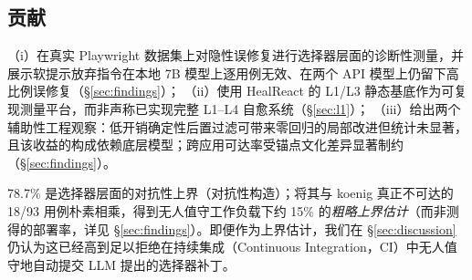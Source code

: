 \subsection{贡献}
（i）在真实 Playwright 数据集上对隐性误修复进行选择器层面的诊断性测量，并展示软提示放弃指令在本地 7B 模型上逐用例无效、在两个 API 模型上仍留下高比例误修复（\S\ref{sec:findings}）；
（ii）使用 HealReact 的 L1/L3 静态基底作为可复现测量平台，而非声称已实现完整 L1--L4 自愈系统（\S\ref{sec:l1}）；
（iii）给出两个辅助性工程观察：低开销确定性后置过滤可带来零回归的局部改进但统计未显著，且该收益的构成依赖底层模型；跨应用可达率受锚点文化差异显著制约（\S\ref{sec:findings}）。

78.7\% 是选择器层面的对抗性上界（对抗性构造）；将其与 koenig 真正不可达的 18/93 用例朴素相乘，得到无人值守工作负载下约 15\% 的\emph{粗略上界估计}（而非测得的部署率，详见 \S\ref{sec:findings}）。即便作为上界估计，我们在 \S\ref{sec:discussion} 仍认为这已经高到足以拒绝在持续集成（Continuous Integration，CI）中无人值守地自动提交 LLM 提出的选择器补丁。
